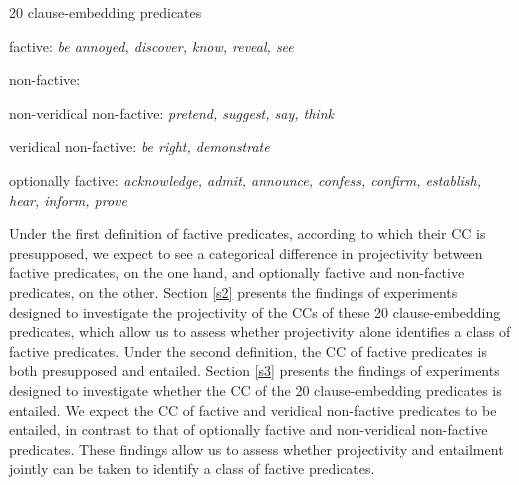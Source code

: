 \documentclass[11pt,fleqn]{article}
\newcommand{\6}{\mbox{$[\hspace*{-.6mm}[$}}
\newcommand{\9}{\mbox{$]\hspace*{-.6mm}]$}}
\begin{document}
\begin{exe}
\ex\label{pred} 20 clause-embedding predicates 

\begin{xlist}

\ex factive: {\em be annoyed, discover, know, reveal, see}

\ex non-factive:

\begin{xlist}

\ex non-veridical non-factive: {\em pretend, suggest, say, think}

\ex veridical non-factive: {\em be right, demonstrate}

\end{xlist}

\ex optionally factive: {\em acknowledge, admit, announce, confess, confirm, establish, hear, inform, prove}

\end{xlist}

\end{exe}

Under the first definition of factive predicates, according to which their CC is presupposed, we expect to see a categorical difference in projectivity between factive predicates, on the one hand, and optionally factive and non-factive predicates, on the other. Section \ref{s2} presents the findings of experiments designed to investigate the projectivity of the CCs of these 20 clause-embedding predicates, which allow us to assess whether projectivity alone identifies a class of factive predicates. Under the second definition, the CC of factive predicates is both presupposed and entailed. Section \ref{s3} presents the findings of experiments designed to investigate whether the CC of the 20 clause-embedding predicates is entailed. We expect the CC of factive and veridical non-factive predicates to be entailed, in contrast to that of optionally factive and non-veridical non-factive predicates. These findings allow us to assess whether projectivity and entailment jointly can be taken to identify a class of factive predicates.


\end{document}
